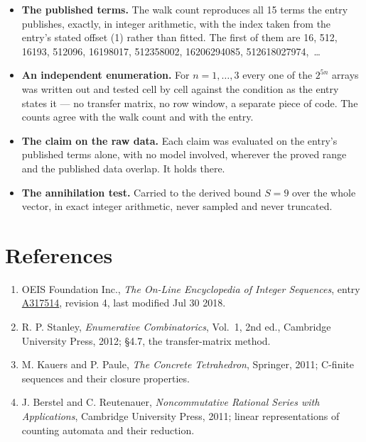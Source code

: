 \documentclass[11pt]{article}
\theoremstyle{definition}
\begin{document}
\begin{itemize}

\item {\bfseries The published terms.} The walk count reproduces all 15 terms the entry publishes, exactly, in integer arithmetic, with the index taken from the entry's stated offset (1) rather than fitted. The first of them are 16, 512, 16193, 512096, 16198017, 512358002, 16206294085, 512618027974,~\dots

\item {\bfseries An independent enumeration.} For $n = 1,\dots,3$ every one of the $2^{5n}$ arrays was written out and tested cell by cell against the condition as the entry states it --- no transfer matrix, no row window, a separate piece of code. The counts agree with the walk count and with the entry.

\item {\bfseries The claim on the raw data.} Each claim was evaluated on the entry's published terms alone, with no model involved, wherever the proved range and the published data overlap. It holds there.

\item {\bfseries The annihilation test.} Carried to the derived bound $S = 9$ over the whole vector, in exact integer arithmetic, never sampled and never truncated.

\end{itemize}

\section{References}

\begin{enumerate}

\item OEIS Foundation Inc., \emph{The On-Line Encyclopedia of Integer Sequences}, entry \href{https://oeis.org/A317514}{A317514}, revision 4, last modified Jul 30 2018.

\item R. P. Stanley, \emph{Enumerative Combinatorics}, Vol.~1, 2nd ed., Cambridge University Press, 2012; \S4.7, the transfer-matrix method.

\item M. Kauers and P. Paule, \emph{The Concrete Tetrahedron}, Springer, 2011; C-finite sequences and their closure properties.

\item J. Berstel and C. Reutenauer, \emph{Noncommutative Rational Series with Applications}, Cambridge University Press, 2011; linear representations of counting automata and their reduction.

\end{enumerate}
\end{document}
